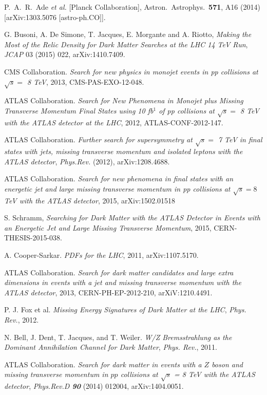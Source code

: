   P.~A.~R.~Ade {\it et al.}  [Planck Collaboration],
  Astron.\ Astrophys.\  {\bf 571}, A16 (2014)
  [arXiv:1303.5076 [astro-ph.CO]].

G. Busoni, A. De Simone, T. Jacques, E. Morgante and A. Riotto, \emph{Making the Most of the Relic Density for Dark Matter Searches at the LHC 14 TeV Run}, \emph{JCAP} 03 (2015) 022, arXiv:1410.7409.

CMS Collaboration. \emph{Search for new physics in monojet events in pp collisions at $\sqrt{s} =$ 8 TeV}, 2013, CMS-PAS-EXO-12-048.

ATLAS Collaboration. \emph{Search for New Phenomena in Monojet plus Missing Transverse Momentum Final States using 10 fb$^{1}$ of pp collisions at $\sqrt{s} =$ 8 TeV with the ATLAS detector at the LHC}, 2012, ATLAS-CONF-2012-147.

ATLAS Collaboration. \emph{Further search for supersymmetry at $\sqrt{s} =$ 7 TeV in final states with jets, missing transverse momentum and isolated leptons with the ATLAS detector}, \emph{Phys.Rev.} (2012), arXiv:1208.4688.

ATLAS Collaboration. \emph{Search for new phenomena in final states with an energetic jet and large missing transverse momentum in pp collisions at $\sqrt{s}=8$ TeV with the ATLAS detector}, 2015, arXiv:1502.01518

S. Schramm, \emph{Searching for Dark Matter with the ATLAS Detector in Events with an Energetic Jet and Large Missing Transverse Momentum}, 2015, CERN-THESIS-2015-038.

A. Cooper-Sarkar. \emph{PDFs for the LHC}, 2011, arXiv:1107.5170.

ATLAS Collaboration. \emph{Search for dark matter candidates and large extra dimensions in events with a jet and missing transverse momentum with the ATLAS detector}, 2013, CERN-PH-EP-2012-210, arXiV:1210.4491.

P. J. Fox et al. \emph{Missing Energy Signatures of Dark Matter at the LHC}, \emph{Phys. Rev.}, 2012.

N. Bell, J. Dent, T. Jacques, and T. Weiler. \emph{W/Z Bremsstrahlung as the Dominant Annihilation Channel for Dark Matter}, \emph{Phys. Rev.}, 2011.

ATLAS Collaboration. \emph{Search for dark matter in events with a $Z$ boson and missing transverse momentum in $pp$ collisions at $\sqrt{s}$ = 8 TeV with the ATLAS detector}, \emph{Phys.Rev.D \textbf{90}} (2014) 012004, arXiv:1404.0051.

